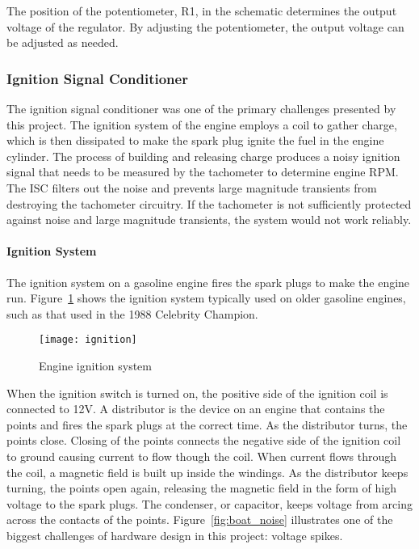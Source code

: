 The position of the potentiometer, R1, in the schematic determines the output voltage of the regulator. By adjusting the potentiometer, the output voltage can be adjusted as needed.

\subsubsection{Ignition Signal Conditioner}
The ignition signal conditioner was one of the primary challenges presented by this project. The ignition system of the engine employs a coil to gather charge, which is then dissipated to make the spark plug ignite the fuel in the engine cylinder. The process of building and releasing charge produces a noisy ignition signal that needs to be measured by the tachometer to determine engine RPM. The ISC filters out the noise and prevents large magnitude transients from destroying the tachometer circuitry. If the tachometer is not sufficiently protected against noise and large magnitude transients, the system would not work reliably.

\paragraph{Ignition System} %
\label{par:ignition}

The ignition system on a gasoline engine fires the spark plugs to make the engine run. Figure~\ref{fig:ignition} shows the ignition system typically used on older gasoline engines, such as that used in the 1988 Celebrity Champion.



\begin{figure}[H]
    \centering
    \texttt{[image: ignition]}
    \caption{Engine ignition system}
    \label{fig:ignition}
\end{figure}

When the ignition switch is turned on, the positive side of the ignition coil is connected to 12V. A distributor is the device on an engine that contains the points and fires the spark plugs at the correct time. As the distributor turns, the points close. Closing of the points connects the negative side of the ignition coil to ground causing current to flow though the coil. When current flows through the coil, a magnetic field is built up inside the windings. As the distributor keeps turning, the points open again, releasing the magnetic field in the form of high voltage to the spark plugs. The condenser, or capacitor, keeps voltage from arcing across the contacts of the points. Figure~\ref{fig:boat_noise} illustrates one of the biggest challenges of hardware design in this project: voltage spikes.


